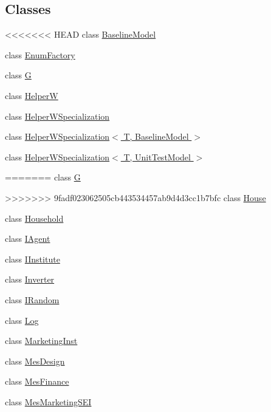 \subsection*{Classes}
\begin{DoxyCompactItemize}
\item 
<<<<<<< HEAD
class \hyperlink{classsolar__core_1_1_baseline_model}{Baseline\+Model}
\item 
class \hyperlink{classsolar__core_1_1_enum_factory}{Enum\+Factory}
\item 
class \hyperlink{classsolar__core_1_1_g}{G}
\item 
class \hyperlink{classsolar__core_1_1_helper_w}{Helper\+W}
\item 
class \hyperlink{classsolar__core_1_1_helper_w_specialization}{Helper\+W\+Specialization}
\item 
class \hyperlink{classsolar__core_1_1_helper_w_specialization_3_01_t_00_01_baseline_model_01_4}{Helper\+W\+Specialization$<$ T, Baseline\+Model $>$}
\item 
class \hyperlink{classsolar__core_1_1_helper_w_specialization_3_01_t_00_01_unit_test_model_01_4}{Helper\+W\+Specialization$<$ T, Unit\+Test\+Model $>$}
\item 
=======
class \hyperlink{classsolar__core_1_1_g}{G}
\item 
>>>>>>> 9fadf023062505cb443534457ab9d4d3cc1b7bfc
class \hyperlink{classsolar__core_1_1_house}{House}
\item 
class \hyperlink{classsolar__core_1_1_household}{Household}
\item 
class \hyperlink{classsolar__core_1_1_i_agent}{I\+Agent}
\item 
class \hyperlink{classsolar__core_1_1_i_institute}{I\+Institute}
\item 
class \hyperlink{classsolar__core_1_1_inverter}{Inverter}
\item 
class \hyperlink{classsolar__core_1_1_i_random}{I\+Random}
\item 
class \hyperlink{classsolar__core_1_1_log}{Log}
\item 
class \hyperlink{classsolar__core_1_1_marketing_inst}{Marketing\+Inst}
\item 
class \hyperlink{classsolar__core_1_1_mes_design}{Mes\+Design}
\item 
class \hyperlink{classsolar__core_1_1_mes_finance}{Mes\+Finance}
\item 
class \hyperlink{classsolar__core_1_1_mes_marketing_s_e_i}{Mes\+Marketing\+S\+E\+I}
\item 

\end{DoxyCompactItemize}
